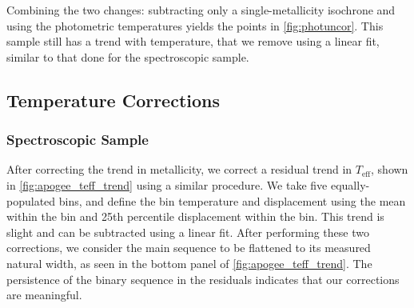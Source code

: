 \documentclass[twocolumn]{aastex6}
\newcommand{\Teff}{\ensuremath{T_{\textrm{eff}}}}
\newcommand{\MK}{\ensuremath{M_{Ks}}}
\newcommand{\feh}{\textrm{[Fe/H]}}
\begin{document}
\begin{figure*}[htb]
    \centering
    \caption{\emph{Top Left}: Vertical displacement above a 1 Gyr,
        metallicity-adjusted MIST isochrone, empirically corrected for
        metallicity trends, for the cool sample with APOGEE temperatures. 
        A slight linear trend in \Teff{} was measured using five bins (shown in
        red). The best-fit relation is \(\Delta \MK{} = -0.000114
        \Teff{} + 0.546\) The median absolute deviation of the 50\% of the 
        sample showing the least luminosity excess within each bin is shown as 
        an error bar. \emph{Bottom Left:} The residuals after subtracting the 
        linear trend. Not shown are the two most metal-poor objects in the
    sample, which have substantially large 
residuals. {Top Right, Bottom Right:} Same as left except using
\citet{Pinsonneault12} temperatures, and subtracting off a constant
\feh{}=0.08 isochrone for all objects instead of a metallicity-adjusted
isochrone. The best-fit relation is \(\Delta \MK{} = -0.0000937 \Teff{}
+ 0.434\)}\label{fig:apogee_teff_trend}
\end{figure*}

Combining the two changes: subtracting only a single-metallicity isochrone and
using the photometric temperatures yields the points in \cref{fig:photuncor}.
This sample still has a trend with temperature, that we remove using a linear
fit, similar to that done for the spectroscopic sample.

\subsection{Temperature Corrections}

\subsubsection{Spectroscopic Sample}

After correcting the trend in metallicity, we correct a residual trend in
\Teff{}, shown in \cref{fig:apogee_teff_trend} using a similar procedure. We
take five equally-populated bins, and define the bin temperature and 
displacement using the mean within the bin  and 25th percentile displacement
within the bin.  This trend is slight and can be subtracted using a linear 
fit. After performing these two corrections, we consider the main sequence to be 
flattened to its measured natural width, as seen in the bottom panel of 
\cref{fig:apogee_teff_trend}. The persistence of the binary sequence in the 
residuals indicates that our corrections are meaningful.  
\end{document}

